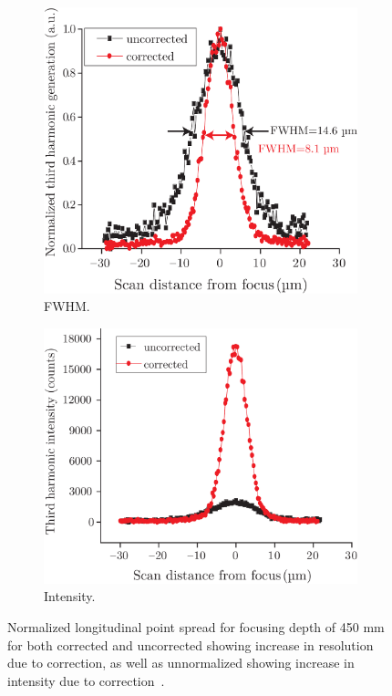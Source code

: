 \begin{figure}[tbh]
       \centering
        \begin{subfigure}[b]{0.45\textwidth}
                \includegraphics[width=\textwidth]{images/genetic_TPFM_FWHM}
                \caption{FWHM.}
                \label{fig:genetic_TPFM_FWHM}
        \end{subfigure}
				\hspace{1em}
        \begin{subfigure}[b]{0.45\textwidth}
                \includegraphics[width=\textwidth]{images/genetic_TPFM_intensity}
                \caption{Intensity.}
                \label{fig:genetic_TPFM_intensity}
        \end{subfigure}
        \caption{Normalized longitudinal point spread for focusing depth of 450 mm for both corrected and uncorrected showing increase in resolution due to correction, as well as unnormalized showing increase in intensity due to correction~\cite{Genetic_MPFM}.}
\label{fig:genetic_TPFM}
\end{figure} 


